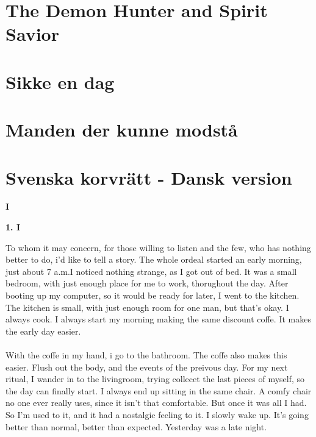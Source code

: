 \documentclass[]{article}
\begin{document}
\section{The Demon Hunter and Spirit Savior}

\section{Sikke en dag}

\section{Manden der kunne modstå}

\section{Svenska korvrätt - Dansk version}

\newpage

\begin{center}
	\Large\textbf{I}
\end{center}

\begin{center}
	\large\textbf{1. I}
\end{center}

To whom it may concern, for those willing to listen and the few, who has nothing better to do, i'd like to tell a story. The whole ordeal started an early morning, just about 7 a.m.I noticed nothing strange, as I got out of bed. It was a small bedroom, with just enough place for me to work, thorughout the day. After booting up my computer, so it would be ready for later, I went to the kitchen. The kitchen is small, with just enough room for one man, but that's okay. I always cook. I always start my morning making the same discount coffe. It makes the early day easier. 
\\ \\
With the coffe in my hand, i go to the bathroom. The coffe also makes this easier. Flush out the body, and the events of the preivous day. For my next ritual, I wander in to the livingroom, trying collecet the last pieces of myself, so the day can finally start. I always end up sitting in the same chair. A comfy chair no one ever really uses, since it isn't that comfortable. But once it was all I had. So I'm used to it, and it had a nostalgic feeling to it. I slowly wake up. It's going better than normal, better than expected. Yesterday was a late night.
\end{document}
